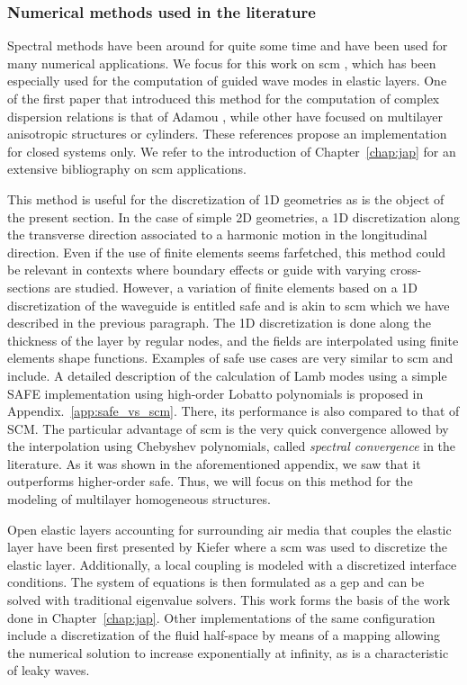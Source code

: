 \subsubsection{Numerical methods used in the literature}
Spectral methods have been around for quite some time and have been used for many numerical applications. We focus for this work on \acrfull{scm} \cite{trefethen2000}, which has been especially used for the computation of guided wave modes in elastic layers. One of the first paper that introduced this method for the computation of complex dispersion relations is that of Adamou \etal \cite{adamou2004}, while other have focused on multilayer anisotropic structures \cite{quintanilla2015} or cylinders\cite{karpfinger2008}. These references propose an implementation for closed systems only. We refer to the introduction of Chapter~\ref{chap:jap} for an extensive bibliography on \acrshort{scm} applications. 

This method is useful for the discretization of 1D geometries as is the object of the present section. In the case of simple 2D geometries, a 1D discretization along the transverse direction associated to a harmonic motion in the longitudinal direction. Even if the use of finite elements seems farfetched, this method could be relevant in contexts where boundary effects or guide with varying cross-sections are studied. However, a variation of finite elements based on a 1D discretization of the waveguide is entitled \acrfull{safe} and is akin to \acrshort{scm} which we have described in the previous paragraph. The 1D discretization is done along the thickness of the layer by regular nodes, and the fields are interpolated using finite elements shape functions. Examples of \acrfull{safe} use cases are very similar to \acrshort{scm} and include. A detailed description of the calculation of Lamb modes using a simple SAFE implementation using high-order Lobatto polynomials is proposed in Appendix.~\ref{app:safe_vs_scm}. There, its performance is also compared to that of SCM. The particular advantage of \acrshort{scm} is the very quick convergence allowed by the interpolation using Chebyshev polynomials, called \emph{spectral convergence} in the literature\cite{trefethen2000,canuto2006,gheorghiu2014}. As it was shown in the aforementioned appendix, we saw that it outperforms higher-order \acrshort{safe}. Thus, we will focus on this method for the modeling of multilayer homogeneous structures. 

Open elastic layers accounting for surrounding air media that couples the elastic layer have been first presented by Kiefer \etal \cite{kiefer2019} where a \acrshort{scm} was used to discretize the elastic layer. Additionally, a local coupling is modeled with a discretized interface conditions. The system of equations is then formulated as a \acrshort{gep} and can be solved with traditional eigenvalue solvers. This work forms the basis of the work done in Chapter~\ref{chap:jap}. Other implementations of the same configuration include a discretization of the fluid half-space by means of a mapping allowing the numerical solution to increase exponentially at infinity, as is a characteristic of leaky waves\cite{georgiades2022}. 

